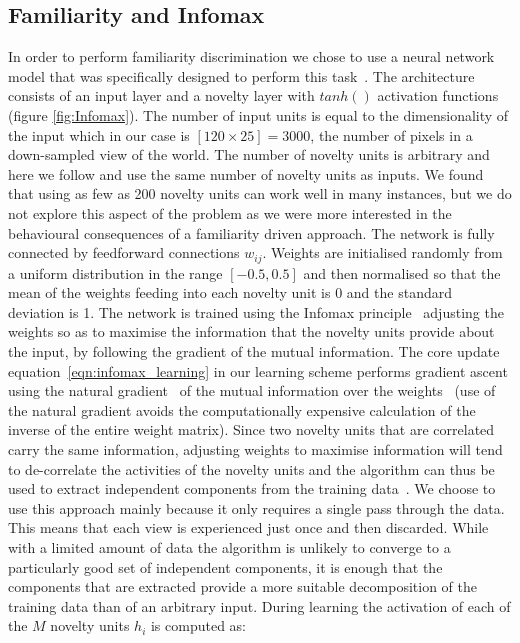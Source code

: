 \documentclass[letterpaper]{article}
\begin{document}
\subsection{Familiarity and Infomax}
In order to perform familiarity discrimination we chose to use a neural network model that was specifically designed to perform this task~\citep{Lulham2011}. 
The architecture consists of an input layer and a novelty layer with $tanh()$ activation functions (figure \ref{fig:Infomax}). 
The number of input units is equal to the dimensionality of the input which in our case is $[120 \times 25]=3000$, the number of pixels in a down-sampled view of the world. 
The number of novelty units is arbitrary and here we follow \citet{Lulham2011} and use the same number of novelty units as inputs. 
We found that using as few as \num{200} novelty units can work well in many instances, but we do not explore this aspect of the problem as we were more interested in the behavioural consequences of a familiarity driven approach. 
The network is fully connected by feedforward connections $w_{ij}$. 
Weights are initialised randomly from a uniform distribution in the range $[-0.5,0.5]$ and then normalised so that the mean of the weights feeding into each novelty unit is \num{0} and the standard deviation is \num{1}. 
The network is trained using the Infomax principle~\citep{Bell1995} adjusting the weights so as to maximise the information that the novelty units provide about the input, by following the gradient of the mutual information. 
The core update equation~\ref{eqn:infomax_learning} in our learning scheme performs gradient ascent using the natural gradient~\citep{Amari1998} of the mutual information over the weights~\citep{Lee1997} (use of the natural gradient avoids the computationally expensive calculation of the inverse of the entire weight matrix). 
Since two novelty units that are correlated carry the same information, adjusting weights to maximise information will tend to de-correlate the activities of the novelty units and the algorithm can thus be used to extract independent components from the training data~\citep{Lee1997}. 
We choose to use this approach mainly because it only requires a single pass through the data. 
This means that each view is experienced just once and then discarded. While with a limited amount of data the algorithm is unlikely to converge to a particularly good set of independent components, it is enough that the components that are extracted provide a more suitable decomposition of the training data than of an arbitrary input.
During learning the activation of each of the $M$ novelty units $h_{i}$ is computed as:
\end{document}

